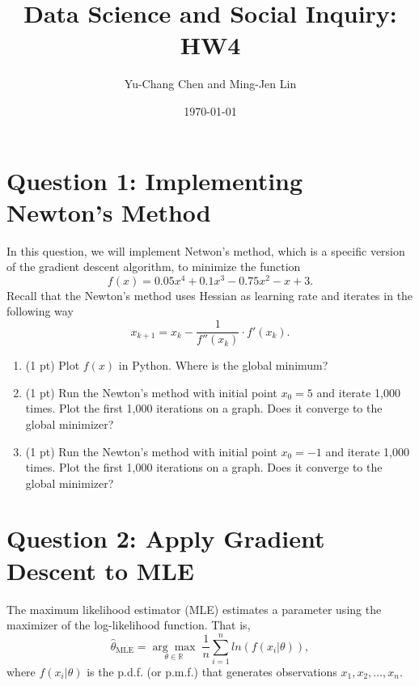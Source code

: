 \documentclass[11pt, oneside]{exam}   	%
\title{Data Science and Social Inquiry: HW4}
\author{Yu-Chang Chen and Ming-Jen Lin}
\date{\today}
\begin{document}
\maketitle
\section*{Question 1: Implementing Newton's Method}
In this question, we will implement Netwon's method, which is a specific version
of the gradient descent algorithm, to minimize the function
\[
	f(x) = 0.05x^4 + 0.1x^3 - 0.75x^2 - x + 3.
\]
Recall that the Newton's method uses Hessian as learning rate and iterates in the
following way
\[
	x_{k+1} = x_k - \frac{1}{f''(x_k)} \cdot f'(x_k).
\]
\begin{enumerate}[label = (\emph{\alph*})]
	\item (1 pt) Plot $f(x)$ in Python. Where is the global minimum?
	      \begin{solution}

	      \end{solution}
	\item (1 pt) Run the Newton's method with initial point $x_0 = 5$
	      and iterate 1,000 times. Plot the first 1,000 iterations on a graph.
		  Does it converge to the global minimizer?
	      \begin{solution}

	      \end{solution}
	\item (1 pt) Run the Newton's method with initial point $x_0 = -1$
	      and iterate 1,000 times. 
		  Plot the first 1,000 iterations on a graph.
		  Does it converge to the global minimizer?
	      \begin{solution}

	      \end{solution}
\end{enumerate}

\section*{Question 2: Apply Gradient Descent to MLE}
The maximum likelihood estimator (MLE) estimates a parameter using the maximizer
of the log-likelihood function. That is,
\[
	\hat{\theta}_{\text{MLE}} = \underset{\theta\in \mathbb{R}}{\arg\max}\; \frac{1}{n}\sum_{i=1}^n ln(f(x_i|\theta)),
\]
where $f(x_i|\theta)$ is the p.d.f. (or p.m.f.) that generates observations
$x_1, x_2,..., x_n$.
\end{document}

